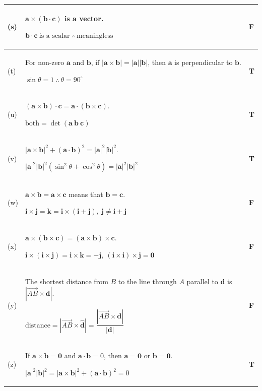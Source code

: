 \documentclass[a4paper,11pt,oneside]{book}
\providecommand{\vv}[1]{\overrightarrow{#1}}\providecommand{\cvv}[3]{\begin{pmatrix}#1\\#2\\#3\end{pmatrix}}
\begin{document}
{\begin{longtable}{|>{\centering\arraybackslash}p{0.9cm}|p{\dimexpr\linewidth-0.9cm-1.6cm-6\tabcolsep-4\arrayrulewidth\relax}|>{\centering\arraybackslash}p{1.6cm}|}
(s)&$\mathbf a\times(\mathbf b\cdot\mathbf c)$ is a vector.\par\smallskip $\displaystyle \mathbf b\cdot\mathbf c\ \text{is a scalar}\ \therefore\ \text{meaningless}$\rule[-6pt]{0pt}{6pt}&\textbf{F}\\\hline
(t)&For non-zero $\mathbf a$ and $\mathbf b$, if $|\mathbf a\times\mathbf b|=|\mathbf a||\mathbf b|$, then $\mathbf a$ is perpendicular to $\mathbf b$.\par\smallskip $\displaystyle \sin\theta=1\ \therefore\ \theta=90^\circ$\rule[-6pt]{0pt}{6pt}&\textbf{T}\\\hline
(u)&$(\mathbf a\times\mathbf b)\cdot\mathbf c=\mathbf a\cdot(\mathbf b\times\mathbf c)$.\par\smallskip $\displaystyle \text{both}=\det\left(\mathbf a\ \mathbf b\ \mathbf c\right)$\rule[-6pt]{0pt}{6pt}&\textbf{T}\\\hline
(v)&$|\mathbf a\times\mathbf b|^2+(\mathbf a\cdot\mathbf b)^2=|\mathbf a|^2|\mathbf b|^2$.\par\smallskip $\displaystyle |\mathbf a|^2|\mathbf b|^2(\sin^2\theta+\cos^2\theta)=|\mathbf a|^2|\mathbf b|^2$\rule[-6pt]{0pt}{6pt}&\textbf{T}\\\hline
(w)&$\mathbf a\times\mathbf b=\mathbf a\times\mathbf c$ means that $\mathbf b=\mathbf c$.\par\smallskip $\displaystyle \mathbf i\times\mathbf j=\mathbf k=\mathbf i\times(\mathbf i+\mathbf j),\ \mathbf j\neq\mathbf i+\mathbf j$\rule[-6pt]{0pt}{6pt}&\textbf{F}\\\hline
(x)&$\mathbf a\times(\mathbf b\times\mathbf c)=(\mathbf a\times\mathbf b)\times\mathbf c$.\par\smallskip $\displaystyle \mathbf i\times(\mathbf i\times\mathbf j)=\mathbf i\times\mathbf k=-\mathbf j,\ (\mathbf i\times\mathbf i)\times\mathbf j=\mathbf 0$\rule[-6pt]{0pt}{6pt}&\textbf{F}\\\hline
(y)&The shortest distance from $B$ to the line through $A$ parallel to $\mathbf d$ is $|\vv{AB}\times\mathbf d|$.\par\smallskip $\displaystyle \text{distance}=|\vv{AB}\times\hat{\mathbf d}|=\dfrac{|\vv{AB}\times\mathbf d|}{|\mathbf d|}$\rule[-6pt]{0pt}{6pt}&\textbf{F}\\\hline
(z)&If $\mathbf a\times\mathbf b=\mathbf 0$ and $\mathbf a\cdot\mathbf b=0$, then $\mathbf a=\mathbf 0$ or $\mathbf b=\mathbf 0$.\par\smallskip $\displaystyle |\mathbf a|^2|\mathbf b|^2=|\mathbf a\times\mathbf b|^2+(\mathbf a\cdot\mathbf b)^2=0$\rule[-6pt]{0pt}{6pt}&\textbf{T}\\\hline
\end{longtable}}
\end{document}
